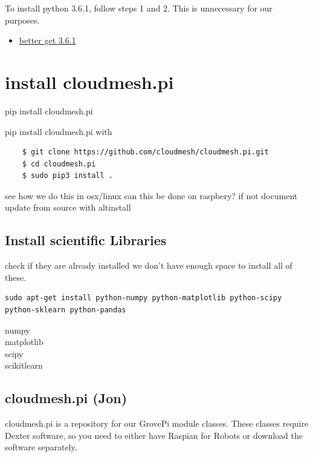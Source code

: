 To install python 3.6.1, follow steps 1 and 2. This is unnecessary for
our purposes.

\begin{itemize}

\item
  \href{https://gist.github.com/dschep/24aa61672a2092246eaca2824400d37f}{better
  get 3.6.1}
\end{itemize}

\section{install cloudmesh.pi}\label{install-cloudmesh.pi}

pip install cloudmesh.pi

pip install cloudmesh.pi with

\begin{verbatim}
    $ git clone https://github.com/cloudmesh/cloudmesh.pi.git
    $ cd cloudmesh.pi
    $ sudo pip3 install .
\end{verbatim}

see how we do this in osx/linux can this be done on raspbery? if not
document update from source with altinstall

\subsection{Install scientific
Libraries}\label{install-scientific-libraries}

check if they are already installed we don't have enough space to
install all of these.

\begin{verbatim}
sudo apt-get install python-numpy python-matplotlib python-scipy python-sklearn python-pandas
\end{verbatim}

numpy\\
matplotlib\\
scipy\\
scikitlearn

\subsection{cloudmesh.pi (Jon)}\label{cloudmesh.pi-jon}

cloudmesh.pi is a repository for our GrovePi module classes. These
classes require Dexter software, so you need to either have Raspian for
Robots or download the software separately.

